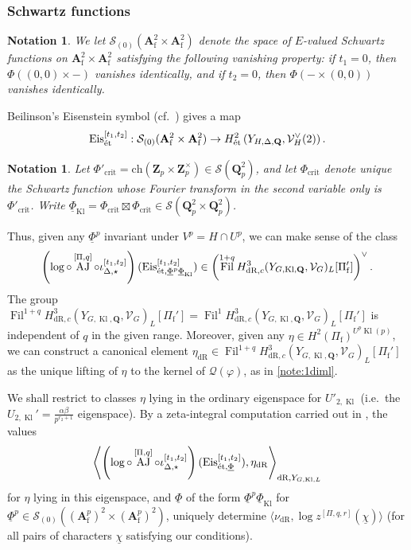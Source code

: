 \documentclass[cjm]{ipart}
\theoremstyle{plain}
\newtheorem{notation}[theorem]{Notation}
\theoremstyle{remark}
\DeclareMathOperator{\AJ}{AJ}
\DeclareMathOperator{\crit}{crit}
\DeclareMathOperator{\Fil}{Fil}
\DeclareMathOperator{\Kl}{Kl}
\newcommand{\Af}{\AA_{\mathrm{f}}}
\newcommand{\Eis}{\mathrm{Eis}}
\newcommand{\Pif}{\Pi_{\mathrm{f}}}
\newcommand{\QQ}{\mathbf{Q}}
\newcommand{\Qp}{\QQ_p}
\newcommand{\Zp}{\mathbf{Z}_p}
\newcommand{\cQ}{\mathcal{Q}}
\newcommand{\cS}{\mathcal{S}}
\newcommand{\cV}{\mathcal{V}}
\newcommand{\ch}{\mathrm{ch}}
\newcommand{\dR}{\mathrm{dR}}
\newcommand{\et}{\text{\textup{\'et}}}
\newcommand{\uPhi}{\underline{\Phi}}
\newcommand{\uchi}{\underline{\chi}}
\renewcommand{\AA}{\mathbf{A}}
\numberwithin{equation}{subsection}
\begin{document}
  \subsubsection*{Schwartz functions}

   \begin{notation}
    We let $\cS_{(0)}(\Af^2 \times \Af^2)$ denote the space of $E$-valued Schwartz functions on $\Af^2 \times \Af^2$ satisfying the following vanishing property: if $t_1 = 0$, then $\Phi( (0, 0) \times -)$ vanishes identically, and if $t_2 = 0$, then $\Phi(- \times (0, 0))$ vanishes identically.
   \end{notation}

   Beilinson's Eisenstein symbol (cf.~\cite[\S 7.2]{LSZ17}) gives a map
   \[
    \Eis_{\et}^{[t_1, t_2]} : \cS_{(0)}(\Af^2 \times \Af^2) \to  H^2_{\et}\left(Y_{H, \Delta, \QQ}, \cV_H^\vee(2)\right).
   \]


   \begin{notation}
    Let $\Phi'_{\crit} = \ch(\Zp \times \Zp^\times) \in \cS(\Qp^2)$, and let $\Phi_{\crit}$ denote unique the Schwartz function whose Fourier transform \emph{in the second variable only} is $\Phi'_{\crit}$. Write $\uPhi_{\Kl} = \Phi_{\crit} \boxtimes \Phi_{\crit} \in \cS(\Qp^2 \times \Qp^2)$.
   \end{notation}

   Thus, given any $\uPhi^p$ invariant under $V^p = H \cap U^p$, we can make sense of the class
   \[
    \left(\log \circ \AJ^{[\Pi, q]} \circ \iota^{[t_1,t_2]}_{\Delta, \star}\right)(\Eis^{[t_1, t_2]}_{\et, \uPhi^p\uPhi_{\Kl}}) \in \left(\Fil^{1 + q} H^3_{\dR, c}(Y_{G, \Kl, \QQ}, \cV_G)_L[\Pif']\right)^\vee.
   \]
   The group $\Fil^{1 + q} H^3_{\dR, c}(Y_{G, \Kl, \QQ}, \cV_G)_L[\Pif'] = \Fil^1 H^3_{\dR, c}(Y_{G, \Kl, \QQ}, \cV_G)_L[\Pif']$ is independent of $q$ in the given range. Moreover, given any $\eta \in H^2(\Pif)^{U^p \Kl(p)}$, we can construct a canonical element $\eta_{\dR} \in \Fil^{1 + q} H^3_{\dR, c}(Y_{G, \Kl, \QQ}, \cV_G)_L[\Pif']$ as the unique lifting of $\eta$ to the kernel of $\cQ(\varphi)$, as in \cref{note:1diml}.

   We shall restrict to classes $\eta$ lying in the ordinary eigenspace for $U'_{2, \Kl}$ (i.e.~the $U_{2, \Kl}' = \frac{\alpha\beta}{p^{r_2 + 1}}$ eigenspace). By a zeta-integral computation carried out in \cite{LZ-equivar}, the values
   \[ \left\langle\left(\log \circ \AJ^{[\Pi, q]} \circ \iota^{[t_1,t_2]}_{\Delta, \star}\right)(\Eis^{[t_1, t_2]}_{\et, \uPhi}), \eta_{\dR}\right\rangle_{\dR, Y_{G, \Kl, L}} \]
   for $\eta$ lying in this eigenspace, and $\uPhi$ of the form $\uPhi^p\uPhi_{\Kl}$ for $\uPhi^p \in \cS_{(0)}((\Af^p)^2 \times (\Af^p)^2)$, uniquely determine $\langle \nu_{\dR}, \log z^{[\Pi, q, r]}(\uchi)\rangle$ (for all pairs of characters $\uchi$ satisfying our conditions).
\end{document}

